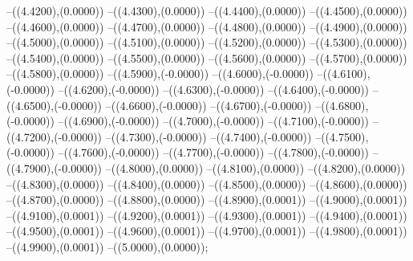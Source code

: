 {	--({\sx*(4.4200)},{\sy*(0.0000)})
	--({\sx*(4.4300)},{\sy*(0.0000)})
	--({\sx*(4.4400)},{\sy*(0.0000)})
	--({\sx*(4.4500)},{\sy*(0.0000)})
	--({\sx*(4.4600)},{\sy*(0.0000)})
	--({\sx*(4.4700)},{\sy*(0.0000)})
	--({\sx*(4.4800)},{\sy*(0.0000)})
	--({\sx*(4.4900)},{\sy*(0.0000)})
	--({\sx*(4.5000)},{\sy*(0.0000)})
	--({\sx*(4.5100)},{\sy*(0.0000)})
	--({\sx*(4.5200)},{\sy*(0.0000)})
	--({\sx*(4.5300)},{\sy*(0.0000)})
	--({\sx*(4.5400)},{\sy*(0.0000)})
	--({\sx*(4.5500)},{\sy*(0.0000)})
	--({\sx*(4.5600)},{\sy*(0.0000)})
	--({\sx*(4.5700)},{\sy*(0.0000)})
	--({\sx*(4.5800)},{\sy*(0.0000)})
	--({\sx*(4.5900)},{\sy*(-0.0000)})
	--({\sx*(4.6000)},{\sy*(-0.0000)})
	--({\sx*(4.6100)},{\sy*(-0.0000)})
	--({\sx*(4.6200)},{\sy*(-0.0000)})
	--({\sx*(4.6300)},{\sy*(-0.0000)})
	--({\sx*(4.6400)},{\sy*(-0.0000)})
	--({\sx*(4.6500)},{\sy*(-0.0000)})
	--({\sx*(4.6600)},{\sy*(-0.0000)})
	--({\sx*(4.6700)},{\sy*(-0.0000)})
	--({\sx*(4.6800)},{\sy*(-0.0000)})
	--({\sx*(4.6900)},{\sy*(-0.0000)})
	--({\sx*(4.7000)},{\sy*(-0.0000)})
	--({\sx*(4.7100)},{\sy*(-0.0000)})
	--({\sx*(4.7200)},{\sy*(-0.0000)})
	--({\sx*(4.7300)},{\sy*(-0.0000)})
	--({\sx*(4.7400)},{\sy*(-0.0000)})
	--({\sx*(4.7500)},{\sy*(-0.0000)})
	--({\sx*(4.7600)},{\sy*(-0.0000)})
	--({\sx*(4.7700)},{\sy*(-0.0000)})
	--({\sx*(4.7800)},{\sy*(-0.0000)})
	--({\sx*(4.7900)},{\sy*(-0.0000)})
	--({\sx*(4.8000)},{\sy*(0.0000)})
	--({\sx*(4.8100)},{\sy*(0.0000)})
	--({\sx*(4.8200)},{\sy*(0.0000)})
	--({\sx*(4.8300)},{\sy*(0.0000)})
	--({\sx*(4.8400)},{\sy*(0.0000)})
	--({\sx*(4.8500)},{\sy*(0.0000)})
	--({\sx*(4.8600)},{\sy*(0.0000)})
	--({\sx*(4.8700)},{\sy*(0.0000)})
	--({\sx*(4.8800)},{\sy*(0.0000)})
	--({\sx*(4.8900)},{\sy*(0.0001)})
	--({\sx*(4.9000)},{\sy*(0.0001)})
	--({\sx*(4.9100)},{\sy*(0.0001)})
	--({\sx*(4.9200)},{\sy*(0.0001)})
	--({\sx*(4.9300)},{\sy*(0.0001)})
	--({\sx*(4.9400)},{\sy*(0.0001)})
	--({\sx*(4.9500)},{\sy*(0.0001)})
	--({\sx*(4.9600)},{\sy*(0.0001)})
	--({\sx*(4.9700)},{\sy*(0.0001)})
	--({\sx*(4.9800)},{\sy*(0.0001)})
	--({\sx*(4.9900)},{\sy*(0.0001)})
	--({\sx*(5.0000)},{\sy*(0.0000)});
}
